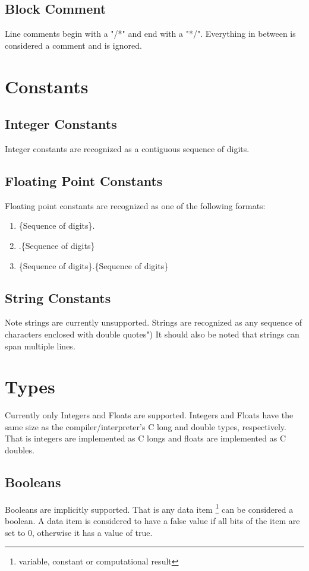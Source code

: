 \documentclass{standalone}
\begin{document}
		\subsection{Block Comment}
			Line comments begin with a "/*"  and end with a "*/". Everything in between is considered a comment and is ignored.

	\section{Constants}
		\subsection{Integer Constants}
			Integer constants are recognized as a contiguous sequence of digits.
		\subsection{Floating Point Constants}
			Floating point constants are recognized as one of the following formats:
			\begin{enumerate}
				\item \{Sequence of digits\}.
				\item .\{Sequence of digits\}
				\item \{Sequence of digits\}.\{Sequence of digits\}
			\end{enumerate}
		\subsection{String Constants}
			Note strings are currently unsupported.
			Strings are recognized as any sequence of characters enclosed with double quotes") It should also be noted that strings can span multiple lines.

	\section{Types}
		Currently only Integers and Floats are supported. Integers and Floats have the same size as the compiler/interpreter's C long and double types, respectively. That is integers are implemented as C longs and floats are implemented as C doubles.

		\subsection{Booleans}
			Booleans are implicitly supported. That is any data item \footnote{ variable, constant or computational result} can be considered a boolean. A data item is considered to have a false value if all bits of the item are set to 0, otherwise it has a value of true.
\end{document}
